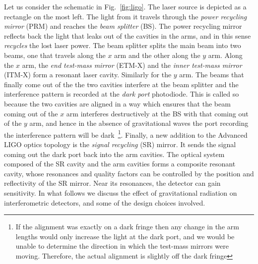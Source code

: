 Let us consider the schematic in Fig.~\ref{fig:ligo}. The laser source is 
depicted as a rectangle on the most left. The light from it travels through 
the {\it power recycling mirror} (PRM) and reaches the {\it beam 
splitter} (BS). The power recycling mirror reflects back the light 
that leaks out of the cavities in the arms, and in this sense {\it recycles}
the lost laser power. 
The beam splitter splits the main beam into two beams, one that travels along 
the $x$ arm and the other along the $y$ arm. Along the $x$ arm, the {\it end 
test-mass mirror} (ETM-X) and the {\it inner test-mass mirror} (ITM-X) form a 
resonant laser cavity. Similarly for the $y$ arm.
The beams that finally come out of the the two cavities interfere at the beam
splitter and the interference pattern is recorded at the {\it dark port} 
photodiode. This is called so because the two cavities are aligned in a way 
which ensures that the beam coming out of the $x$ arm interferes destructively
at the BS with that coming out of the $y$ arm, and hence in the absence of 
gravitational waves the port recording the interference pattern will be 
dark~\footnote{If the alignment was exactly on a dark fringe then any change in 
the arm lengths would only increase the light at the dark port, and we
would be unable to determine the direction in which the test-mass mirrors were
moving.  Therefore, the actual alignment is slightly off the dark fringe}.
% 
Finally, a new addition to the Advanced LIGO optics topology is the {\it signal
recycling} (SR) mirror. It sends the signal coming out the dark port back into 
the arm cavities.
The optical system composed of the SR cavity and the arm
cavities forms a
composite resonant cavity, whose resonances and quality
factors can be controlled by the position and
reﬂectivity of the SR mirror. 
Near its resonances, the detector can gain sensitivity. 
% 
In what follows we discuss the effect of gravitational radiation on 
interferometric detectors, and some of the design choices involved.


